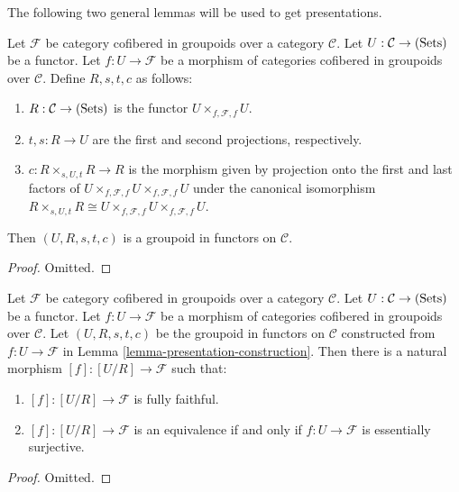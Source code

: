 \noindent
The following two general lemmas will be used to get presentations.
\begin{lemma}
\label{lemma-presentation-construction}
Let $\mathcal F$ be category cofibered in groupoids over a category $\mathcal 
C$.  Let $U: \mathcal C \rightarrow \textnormal{(Sets)}$ be a functor. Let $f: 
U \rightarrow \mathcal F$ be a morphism of categories cofibered in groupoids 
over $\mathcal C$. Define $R,s,t,c$ as follows:
\begin{enumerate}
\item $R: \mathcal C \rightarrow \textnormal{(Sets)}$ is the functor $U 
\times_{f,\mathcal F,f} U$.
\item $t,s: R \rightarrow U$ are the first and second projections, 
respectively. 
\item $c: R \times_{s,U,t} R \rightarrow R$ is the morphism given by projection 
onto the first and last factors of $U \times_{f, \mathcal F, f} U 
\times_{f,\mathcal F,f} U$ under the canonical isomorphism $R \times_{s,U,t} R 
\cong U \times_{f, \mathcal F, f} U \times_{f,\mathcal F,f} U$.
\end{enumerate}
Then $(U,R,s,t,c)$ is a groupoid in functors on $\mathcal C$.
\end{lemma}

\begin{proof}
Omitted.
\end{proof}

\begin{lemma}
\label{lemma-presentation-morphism}
Let $\mathcal F$ be category cofibered in groupoids over a category $\mathcal 
C$.  Let $U: \mathcal C \rightarrow \textnormal{(Sets)}$ be a functor. Let $f: 
U \rightarrow \mathcal F$ be a morphism of categories cofibered in groupoids 
over $\mathcal C$. Let $(U,R,s,t,c)$ be the groupoid in functors on $\mathcal 
C$ constructed from $f: U \rightarrow \mathcal F$ in Lemma 
\ref{lemma-presentation-construction}.  Then there is a natural morphism $[f]: 
[U/R] \rightarrow \mathcal F$ such that:
\begin{enumerate}
\item $[f]: [U/R] \rightarrow \mathcal F$ is fully faithful.
\item $[f]: [U/R] \rightarrow \mathcal F$ is an equivalence if and only if $f: 
U \rightarrow \mathcal F$ is essentially surjective.
\end{enumerate}
\end{lemma}

\begin{proof}
Omitted.
\end{proof}

